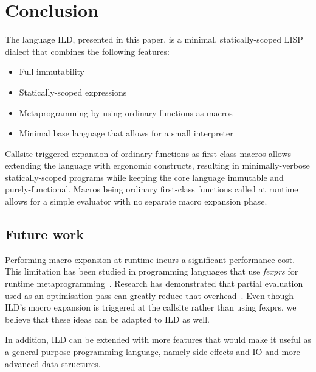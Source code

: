 \section{Conclusion}
The language ILD, presented in this paper, is a minimal, statically-scoped
LISP dialect that combines the following features:
\begin{itemize}
\item Full immutability
\item Statically-scoped expressions
\item Metaprogramming by using ordinary functions as macros
\item Minimal base language that allows for a small interpreter
\end{itemize}
Callsite-triggered expansion of ordinary functions as first-class macros
allows extending the language with ergonomic constructs,
resulting in minimally-verbose statically-scoped programs while keeping
the core language immutable and purely-functional. Macros being ordinary first-class
functions called at runtime allows for a simple evaluator with no separate
macro expansion phase.
\subsection{Future work}
Performing macro expansion at runtime incurs a significant performance cost.
This limitation has been studied in programming languages that use \emph{fexprs}
for runtime metaprogramming~\cite{kernel-report}. Research has demonstrated
that partial evaluation used as an optimisation pass can greatly reduce that
overhead~\cite{fexpr-pe}. Even though ILD's macro expansion is triggered at the
callsite rather than using fexprs, we believe that these ideas can be adapted
to ILD as well.

In addition, ILD can be extended with more features that would make it useful
as a general-purpose programming language, namely side effects and IO and more advanced
data structures.
